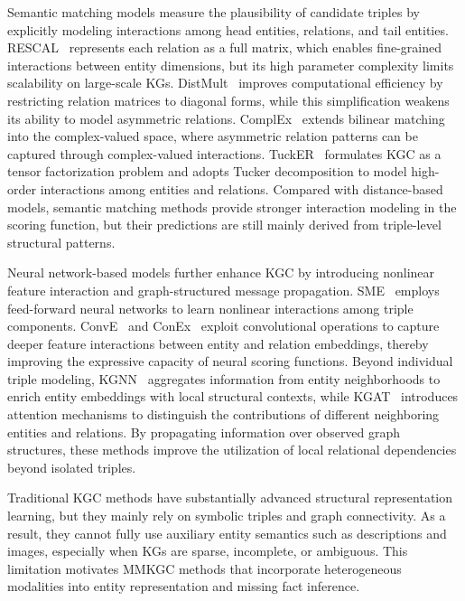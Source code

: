 \documentclass[a4paper,fleqn]{cas-sc}
\begin{document}
Semantic matching models measure the plausibility of candidate triples by explicitly modeling interactions among head entities, relations, and tail entities. RESCAL~\cite{nickel2011rescal} represents each relation as a full matrix, which enables fine-grained interactions between entity dimensions, but its high parameter complexity limits scalability on large-scale KGs. DistMult~\cite{yang2015distmult} improves computational efficiency by restricting relation matrices to diagonal forms, while this simplification weakens its ability to model asymmetric relations. ComplEx~\cite{trouillon2016complex} extends bilinear matching into the complex-valued space, where asymmetric relation patterns can be captured through complex-valued interactions. TuckER~\cite{balazevic2019tucker} formulates KGC as a tensor factorization problem and adopts Tucker decomposition to model high-order interactions among entities and relations. Compared with distance-based models, semantic matching methods provide stronger interaction modeling in the scoring function, but their predictions are still mainly derived from triple-level structural patterns.

Neural network-based models further enhance KGC by introducing nonlinear feature interaction and graph-structured message propagation. SME~\cite{bordes2014sme} employs feed-forward neural networks to learn nonlinear interactions among triple components. ConvE~\cite{dettmers2018conve} and ConEx~\cite{demir2021conex} exploit convolutional operations to capture deeper feature interactions between entity and relation embeddings, thereby improving the expressive capacity of neural scoring functions. Beyond individual triple modeling, KGNN~\cite{wang2019kgnn} aggregates information from entity neighborhoods to enrich entity embeddings with local structural contexts, while KGAT~\cite{wang2019kgat} introduces attention mechanisms to distinguish the contributions of different neighboring entities and relations. By propagating information over observed graph structures, these methods improve the utilization of local relational dependencies beyond isolated triples.

Traditional KGC methods have substantially advanced structural representation learning, but they mainly rely on symbolic triples and graph connectivity. As a result, they cannot fully use auxiliary entity semantics such as descriptions and images, especially when KGs are sparse, incomplete, or ambiguous. This limitation motivates MMKGC methods that incorporate heterogeneous modalities into entity representation and missing fact inference.
\end{document}
